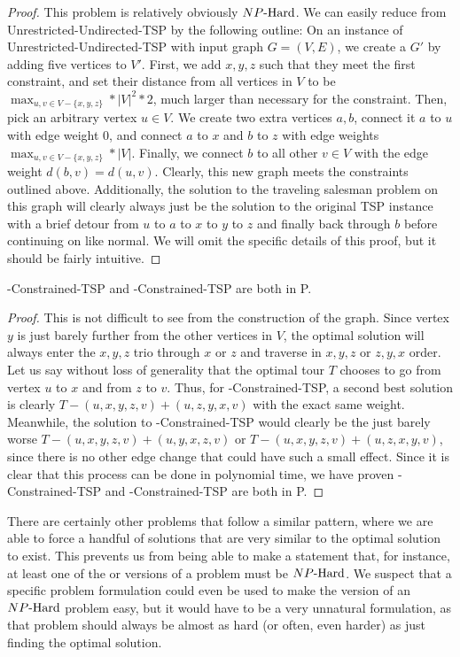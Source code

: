 \begin{proof}
This problem is relatively obviously ${NP\text{-Hard{}}}$. We can easily reduce from Unrestricted-Undirected-TSP by the following outline:
    On an instance of Unrestricted-Undirected-TSP with input graph $G = (V,E)$, we create a $G'$ by adding five vertices to $V'$. First, we add $x,y,z$ such that they meet the first constraint, and set their distance from all vertices in $V$ to be $\max_{u,v \in V - \{x,y,z\}}*|V|^2*2$, much larger than necessary for the constraint. Then, pick an arbitrary vertex $u \in V$. We create two extra vertices $a,b$, connect it $a$ to $u$ with edge weight $0$, and connect $a$ to $x$ and $b$ to $z$ with edge weights $\max_{u,v \in V - \{x,y,z\}}*|V|$. Finally, we connect $b$ to all other $v \in V$ with the edge weight $d(b,v) = d(u,v)$. Clearly, this new graph meets the constraints outlined above. Additionally, the solution to the traveling salesman problem on this graph will clearly always just be the solution to the original TSP instance with a brief detour from $u$ to $a$ to $x$ to $y$ to $z$ and finally back through $b$ before continuing on like normal. We will omit the specific details of this proof, but it should be fairly intuitive.
\end{proof}
\begin{theorem}
    \exob{}-Constrained-TSP and \inob{}-Constrained-TSP are both in P.
\end{theorem}
\begin{proof}
    This is not difficult to see from the construction of the graph. Since vertex $y$ is just barely further from the other vertices in $V$, the optimal solution will always enter the $x,y,z$ trio through $x$ or $z$ and traverse in $x,y,z$ or $z,y,x$ order. Let us say without loss of generality that the optimal tour $T$ chooses to go from vertex $u$ to $x$ and from $z$ to $v$. Thus, for \inob{}-Constrained-TSP, a second best solution is clearly $T - (u,x,y,z,v) + (u,z,y,x,v)$ with the exact same weight. Meanwhile, the solution to \exob{}-Constrained-TSP would clearly be the just barely worse $T - (u,x,y,z,v) + (u,y,x,z,v)$ or $T - (u,x,y,z,v) + (u,z,x,y,v)$, since there is no other edge change that could have such a small effect. Since it is clear that this process can be done in polynomial time, we have proven \exob{}-Constrained-TSP and \inob{}-Constrained-TSP are both in P.
\end{proof}
There are certainly other problems that follow a similar pattern, where we are able to force a handful of solutions that are very similar to the optimal solution to exist. This prevents us from being able to make a statement that, for instance, at least one of the \exob{} or \inob{} versions of a problem must be ${NP\text{-Hard{}}}$. We suspect that a specific problem formulation could even be used to make the \exb{} version of an ${NP\text{-Hard{}}}$ problem easy, but it would have to be a very unnatural formulation, as that problem should always be almost as hard (or often, even harder) as just finding the optimal solution.


